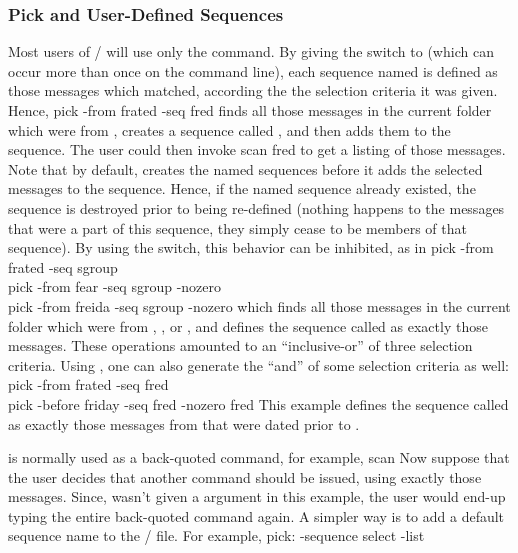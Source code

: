 \subsubsection{Pick and User-Defined Sequences}
Most users of \MH/ will use only the  command.
By giving the  switch to 
(which can occur more than once on the command line),
each sequence named is defined as those messages which  matched,
according the the selection criteria it was given.
Hence,
\example pick -from frated -seq fred\endexample
finds all those messages in the current folder which were from
,
creates a sequence called ,
and then adds them to the sequence.
The user could then invoke
\example scan fred\endexample
to get a  listing of those messages.
Note that by default,
 creates the named sequences
before it adds the selected messages to the sequence.
Hence, if the named sequence already existed,
the sequence is destroyed prior to being re-defined
(nothing happens to the messages that were a part of this sequence,
they simply cease to be members of that sequence).
By using the  switch, this behavior can be inhibited,
as in
\example
    pick -from frated -seq sgroup\\
    pick -from fear -seq sgroup -nozero\\
    pick -from freida -seq sgroup -nozero%
\endexample
which finds all those messages in the current folder which were from
, , or ,
and defines the sequence called  as exactly those messages.
These operations amounted to an ``inclusive-or'' of three selection
criteria.
Using ,
one can also generate the ``and'' of some selection criteria as well:
\example
    pick -from frated -seq fred\\
    pick -before friday -seq fred -nozero fred%
\endexample
This example defines the sequence called  as exactly those
messages from  that were dated prior to .
\par
{} is normally used as a back-quoted command,
for example,
\example scan \endexample
Now suppose that the user decides that another command should be issued,
using exactly those messages.
Since,
 wasn't given a  argument in this example,
the user would end-up typing the entire back-quoted command again.
A simpler way is to add a default sequence name to the \profile/ file.
For example,
\example pick: -sequence select -list\endexample
